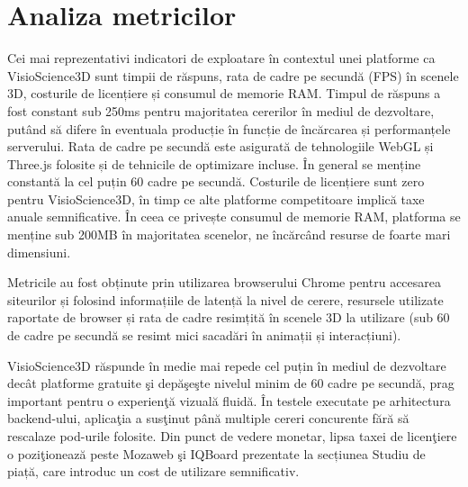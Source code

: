 \section{Analiza metricilor}
\label{subsec:analiza-metrici}

Cei mai reprezentativi indicatori de exploatare în contextul unei platforme ca VisioScience3D 
sunt timpii de răspuns, rata de cadre pe secundă (FPS) în scenele 3D, costurile de licențiere
și consumul de memorie RAM. Timpul de răspuns a fost constant sub 250ms pentru majoritatea cererilor
în mediul de dezvoltare, putând să difere în eventuala producție în funcție de încărcarea și performanțele serverului.
Rata de cadre pe secundă este asigurată de tehnologiile WebGL și Three.js folosite și de 
tehnicile de optimizare incluse. În general se menține constantă la cel puțin 60 cadre pe secundă.
Costurile de licențiere sunt zero pentru VisioScience3D, în timp ce alte platforme competitoare
implică taxe anuale semnificative. În ceea ce privește consumul de memorie RAM, platforma
se menține sub 200MB în majoritatea scenelor, ne încărcând resurse de foarte mari
dimensiuni.

Metricile au fost obținute prin utilizarea browserului Chrome pentru accesarea siteurilor și folosind informațiile
de latență la nivel de cerere, resursele utilizate raportate de browser și rata de cadre resimțită în scenele 3D
la utilizare (sub 60 de cadre pe secundă se resimt mici sacadări în animații și interacțiuni).

VisioScience3D răspunde în medie mai repede cel puțin în mediul de dezvoltare decât platforme gratuite 
şi depăşeşte nivelul minim de 60 cadre pe secundă, prag important pentru o
experienţă vizuală fluidă. În testele executate pe arhitectura backend-ului, aplicaţia a susţinut
până multiple cereri concurente fără să rescalaze pod-urile folosite.
Din punct de vedere monetar, lipsa taxei de licenţiere o poziţionează peste Mozaweb şi IQBoard prezentate la secțiunea Studiu
de piață, care introduc un cost de utilizare semnificativ.

